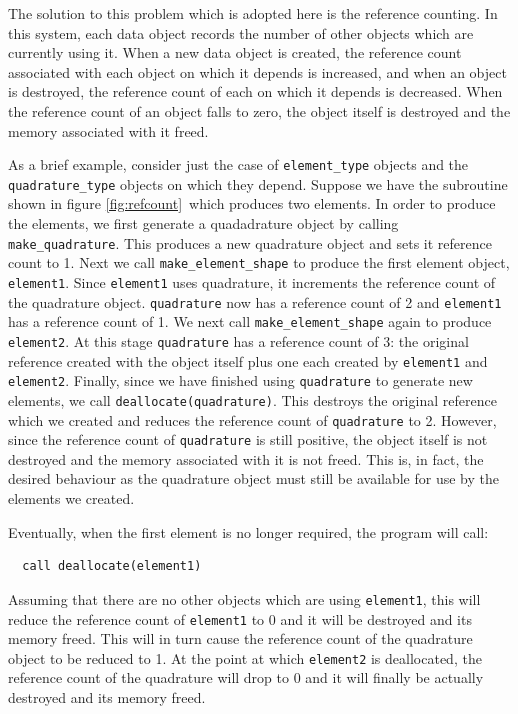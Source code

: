 \documentclass[a4paper, 11pt]{book}
\begin{document}
The solution to this problem which is adopted here is the reference
counting. In this system, each data object records the number of other
objects which are currently using it. When a new data object is created, the
reference count associated with each object on which it depends is
increased, and when an object is destroyed, the reference count of each on
which it depends is decreased. When the reference count of an object falls
to zero, the object itself is destroyed and the memory associated with it
freed.

As a brief example, consider just the case of \lstinline+element_type+
objects and the \lstinline+quadrature_type+ objects on which they
depend. Suppose we have the subroutine shown in figure
\ref{fig:refcount}\ which produces two elements. In order to produce the
elements, we first generate a quadadrature object by calling
\lstinline+make_quadrature+. This produces a new quadrature object and sets
it reference count to 1. Next we call \lstinline+make_element_shape+ to
produce the first element object, \lstinline+element1+. Since
\lstinline+element1+ uses quadrature, it increments the reference count of
the quadrature object. \lstinline+quadrature+  now has a reference count of 2
and \lstinline+element1+ has a reference count of 1. We next call
\lstinline+make_element_shape+ again to produce \lstinline+element2+. At this stage
\lstinline+quadrature+ has a reference count of 3: the original reference
created with the object itself plus one each created by \lstinline+element1+
and \lstinline+element2+. Finally, since we have finished using \lstinline+quadrature+
to generate new elements, we call \lstinline+deallocate(quadrature)+. This
destroys the original reference which we created and reduces the reference
count of \lstinline+quadrature+ to 2. However, since the reference count of
\lstinline+quadrature+ is still positive, the object itself is not destroyed
and the memory associated with it is not freed. This is, in fact, the
desired behaviour as the quadrature object must still be available for use
by the elements we created. 

Eventually, when the first element is no longer required, the program will call:
\begin{lstlisting}
  call deallocate(element1)
\end{lstlisting}
Assuming that there are no other objects which are using
\lstinline+element1+, this will reduce the reference count of
\lstinline+element1+ to 0 and it will be destroyed and its memory freed.
This will in turn cause the reference count of the quadrature object to be
reduced to 1. At the point at which \lstinline+element2+ is deallocated, the
reference count of the quadrature will drop to 0 and it will finally be
actually destroyed and its memory freed.
\end{document}
